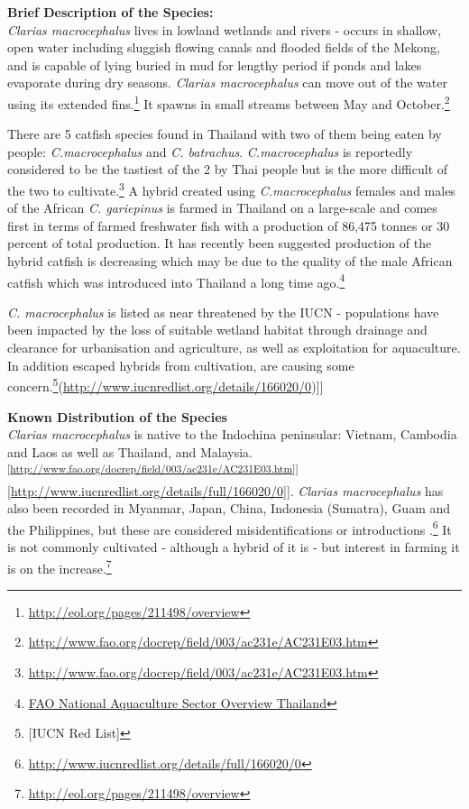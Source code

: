 \documentclass[]{book}
\theoremstyle{definition}
\theoremstyle{definition}
\theoremstyle{definition}
\theoremstyle{remark}
\begin{document}
\textbf{Brief Description of the Species:}\\
\emph{Clarias macrocephalus} lives in lowland wetlands and rivers -
occurs in shallow, open water including sluggish flowing canals and
flooded fields of the Mekong, and is capable of lying buried in mud for
lengthy period if ponds and lakes evaporate during dry seasons.
\emph{Clarias macrocephalus} can move out of the water using its
extended fins.\footnote{\url{http://eol.org/pages/211498/overview}} It
spawns in small streams between May and October.\footnote{\url{http://www.fao.org/docrep/field/003/ac231e/AC231E03.htm}}

There are 5 catfish species found in Thailand with two of them being
eaten by people: \emph{C.macrocephalus} and \emph{C. batrachus}.
\emph{C.macrocephalus} is reportedly considered to be the tastiest of
the 2 by Thai people but is the more difficult of the two to
cultivate.\footnote{\url{http://www.fao.org/docrep/field/003/ac231e/AC231E03.htm}}
A hybrid created using \emph{C.macrocephalus} females and males of the
African \emph{C. gariepinus} is farmed in Thailand on a large-scale and
comes first in terms of farmed freshwater fish with a production of
86,475 tonnes or 30 percent of total production. It has recently been
suggested production of the hybrid catfish is decreasing which may be
due to the quality of the male African catfish which was introduced into
Thailand a long time ago.\footnote{\href{http://www.fao.org/fishery/countrysector/naso_thailand/en}{FAO
  National Aquaculture Sector Overview Thailand}}

\emph{C. macrocephalus} is listed as near threatened by the IUCN -
populations have been impacted by the loss of suitable wetland habitat
through drainage and clearance for urbanisation and agriculture, as well
as exploitation for aquaculture. In addition escaped hybrids from
cultivation, are causing some concern.\footnote{{[}IUCN Red List{]}}(\url{http://www.iucnredlist.org/details/166020/0}){]}{]}

\textbf{Known Distribution of the Species}\\
\emph{Clarias macrocephalus} is native to the Indochina peninsular:
Vietnam, Cambodia and Laos as well as Thailand, and
Malaysia.\textsuperscript{{[}\url{http://www.fao.org/docrep/field/003/ac231e/AC231E03.htm}{]}{]}}{[}\url{http://www.iucnredlist.org/details/full/166020/0}{]}{]}.
\emph{Clarias macrocephalus} has also been recorded in Myanmar, Japan,
China, Indonesia (Sumatra), Guam and the Philippines, but these are
considered misidentifications or introductions .\footnote{\url{http://www.iucnredlist.org/details/full/166020/0}}
It is not commonly cultivated - although a hybrid of it is - but
interest in farming it is on the increase.\footnote{\url{http://eol.org/pages/211498/overview}}
\end{document}
